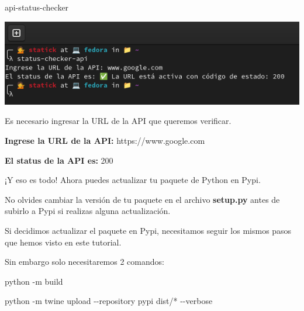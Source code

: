 \documentclass[
  a4paper,
  DIV=11,
  numbers=noendperiod,
  onepage,
  openany]{scrreprt}
\newenvironment{Shaded}{\begin{snugshade}}{\end{snugshade}}
\newcommand{\AttributeTok}[1]{\textcolor[rgb]{0.40,0.45,0.13}{#1}}
\newcommand{\ExtensionTok}[1]{\textcolor[rgb]{0.00,0.23,0.31}{#1}}
\newcommand{\NormalTok}[1]{\textcolor[rgb]{0.00,0.23,0.31}{#1}}
\newcommand{\PreprocessorTok}[1]{\textcolor[rgb]{0.68,0.00,0.00}{#1}}
\begin{document}
\begin{tcolorbox}
\begin{Shaded}
\begin{Highlighting}[]
\ExtensionTok{api{-}status{-}checker}
\end{Highlighting}
\end{Shaded}

\includegraphics{unidades/unidad4/images/paste-11.png}

Es necesario ingresar la URL de la API que queremos verificar.

\textbf{Ingrese la URL de la API:} https://www.google.com

\textbf{El status de la API es:} 200

¡Y eso es todo! Ahora puedes actualizar tu paquete de Python en Pypi.

\begin{tcolorbox}[enhanced jigsaw, bottomrule=.15mm, title=\textcolor{quarto-callout-tip-color}{\faLightbulb}\hspace{0.5em}{Tip}, coltitle=black, leftrule=.75mm, left=2mm, colbacktitle=quarto-callout-tip-color!10!white, breakable, colframe=quarto-callout-tip-color-frame, colback=white, opacitybacktitle=0.6, opacityback=0, bottomtitle=1mm, toptitle=1mm, toprule=.15mm, arc=.35mm, titlerule=0mm, rightrule=.15mm]

No olvides cambiar la versión de tu paquete en el archivo
\textbf{setup.py} antes de subirlo a Pypi si realizas alguna
actualización.

\end{tcolorbox}

Si decidimos actualizar el paquete en Pypi, necesitamos seguir los
mismos pasos que hemos visto en este tutorial.

Sin embargo solo necesitaremos 2 comandos:

\begin{Shaded}
\begin{Highlighting}[]
\ExtensionTok{python} \AttributeTok{{-}m}\NormalTok{ build}
\end{Highlighting}
\end{Shaded}

\begin{Shaded}
\begin{Highlighting}[]
\ExtensionTok{python} \AttributeTok{{-}m}\NormalTok{ twine upload }\AttributeTok{{-}{-}repository}\NormalTok{ pypi dist/}\PreprocessorTok{*} \AttributeTok{{-}{-}verbose}
\end{Highlighting}
\end{Shaded}


\end{tcolorbox}
\end{document}
